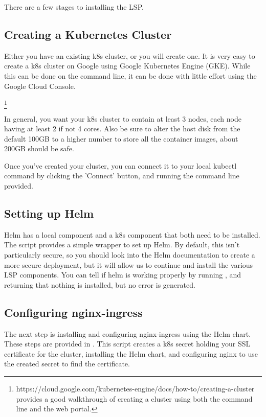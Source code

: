 \documentclass[11pt,twoside]{article}
\begin{document}
There are a few stages to installing the LSP.

\subsection{Creating a Kubernetes Cluster}

Either you have an existing k8s cluster, or you will create one.  It is very
easy to create a k8s cluster on Google using Google Kubernetes Engine (GKE).
While this can be done on the command line, it can be done with little effort
using the Google Cloud Console.

\footnote{https://cloud.google.com/kubernetes-engine/docs/how-to/creating-a-cluster
provides a good walkthrough of creating a cluster using both the command line
and the web portal.}

In general, you want your k8s cluster to contain at least 3 nodes, each node
having at least 2 if not 4 cores.  Also be sure to alter the host disk from
the default 100GB to a higher number to store all the container images, about
200GB should be safe.

Once you've created your cluster, you can connect it to your local kubectl
command by clicking the 'Connect' button, and running the command line provided.

\subsection{Setting up Helm}

Helm has a local component and a k8s component that both need to be installed.
The  script provides a simple wrapper to set up Helm.
By default, this isn't particularly secure, so you should look into the Helm
documentation to create a more secure deployment, but it will allow us to
continue and install the various LSP components.  You can tell if helm is
working properly by running , and returning that nothing
is installed, but no error is generated.

\subsection{Configuring nginx-ingress}

The next step is installing and configuring nginx-ingress using the Helm chart.
These steps are provided in .  This script creates
a k8s secret holding your SSL certificate for the cluster, installing the Helm
chart, and configuring nginx to use the created secret to find the certificate.
\end{document}
